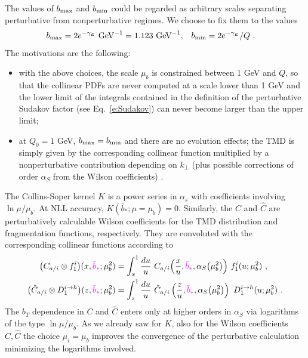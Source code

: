 \documentclass[aps,preprintnumbers,showpacs,nofootinbib,superscriptaddress,floatfix]{revtex4}
\newcommand{\AS}[1]{{\textcolor[rgb]{1,0,1}{#1}}}
\newcommand{\T}{\perp}
\newcommand{\bb}{b}
\begin{document}
The values of $\bb_{\rm max}$ and
$\bb_{\rm min}$ could
be regarded as arbitrary scales separating perturbative from nonperturbative
regimes. 
We choose to fix them to the
values 
\begin{align}
\bb_{\rm max} &= 2 e^{-\gamma_E}  \text{  GeV}^{-1} = 1.123 \text{  GeV}^{-1}, 
&
\bb_{\rm min} &= 2 e^{-\gamma_E}/Q \ .
\label{e:bminmax}
\end{align} 
The motivations are the following: 
\begin{itemize}
\item{} with the above choices, the scale $\mu_b$ is
  constrained between 1 GeV and $Q$, so that the collinear PDFs are never
  computed at a scale lower than 1 GeV and the lower limit of the integrals
  contained in the definition of the perturbative Sudakov factor \AS{(see Eq.~\eqref{e:Sudakov})} can never
  become larger than the upper limit;
\item{} at $Q_0 = 1$ GeV, $\bb_{\rm max} = \bb_{\rm min}$ and there are no evolution effects; the TMD is
simply given by the corresponding collinear function multiplied by a
nonperturbative contribution depending on $k_\T$ (plus possible corrections of
order $\alpha_S$ from the Wilson coefficients) .
\end{itemize} 

\AS{The Collins-Soper kernel $K$ is a power series in $\alpha_s$ with coefficients involving $\ln \mu/\mu_b$. At NLL accuracy, $K(\bar{b}_{\ast};\mu=\mu_b) = 0$.}
\AS{Similarly, }the $C$ and $\hat{C}$ are perturbatively calculable Wilson coefficients for
the TMD distribution and fragmentation functions, respectively. 
They are convoluted with the corresponding collinear functions according to 
\begin{align}
\bigl( C_{a/i} \otimes f_1^i \bigr) (x,\AS{\bar{b}_\ast}; \mu_b^2) &=
  \int_x^1 \frac{du}{u}\  
        C_{a/i} \Big( \frac{x}{u}, \AS{\bar{b}_\ast}, \alpha_S\big(\mu_b^2\big)  \Big) \  
        f_1^i (u; \mu_b^2) \  , 
\label{e:WC1} \\
\bigl( \hat{C}_{a/i} \otimes D_1^{i\to h} \bigr) (z,\AS{\bar{b}_\ast}; \mu_b^2) &= \int_z^1 \frac{du}{u}\  \hat{C}_{a/i} \left( \frac{z}{u},\AS{\bar{b}_\ast}, \alpha_S\big(\mu_b^2\big) \right) \  D_1^{i\to h} (u; \mu_b^2) \  . 
\label{e:WC2}
\end{align}
\AS{The $b_T$ dependence in $C$ and $\hat{C}$ enters only at higher orders in $\alpha_S$ via logarithms of the type $\ln \mu/\mu_b$. 
As we already saw for $K$, also for the Wilson coefficients $C,\hat{C}$ the choice $\mu_i=\mu_b$ improves the convergence of the perturbative calculation minimizing the logarithms involved.} 
\end{document}
